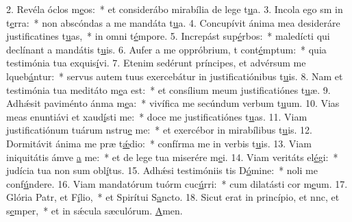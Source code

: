 2. Revéla óclos m\uline{e}os:~* et considerábo mirabília de lege t\uline{u}a.
3. Incola ego sm in t\uline{e}rra:~* non abscóndas a me mandáta t\uline{u}a.
4. Concupívit ánima mea desideráre justificatines t\uline{u}as,~* in omni t\uline{é}mpore.
5. Increpást sup\uline{é}rbos:~* maledícti qui declínant a mandátis t\uline{u}is.
6. Aufer a me oppróbrium, t cont\uline{é}mptum:~* quia testimónia tua exquis\uline{í}vi.
7. Etenim sedérunt príncipes, et advérsum me lqueb\uline{á}ntur:~* servus autem tuus exercebátur in justificatiónibus t\uline{u}is.
8. Nam et testimónia tua meditáto m\uline{e}a est:~* et consílium meum justificatiónes t\uline{u}æ.
9. Adhǽsit paviménto ánma m\uline{e}a:~* vivífica me secúndum verbum t\uline{u}um.
10. Vias meas enuntiávi et xaud\uline{í}sti me:~* doce me justificatiónes t\uline{u}as.
11. Viam justificatiónum tuárum nstru\uline{e} me:~* et exercébor in mirabílibus t\uline{u}is.
12. Dormitávit ánima me præ t\uline{ǽ}dio:~* confírma me in verbis t\uline{u}is.
13. Viam iniquitátis ámve \uline{a} me:~* et de lege tua miserére m\uline{e}i.
14. Viam veritáts el\uline{é}gi:~* judícia tua non sum obl\uline{í}tus.
15. Adhǽsi testimóniis tis D\uline{ó}mine:~* noli me conf\uline{ú}ndere.
16. Viam mandatórum tuórm cuc\uline{ú}rri:~* cum dilatásti cor m\uline{e}um.
17. Glória Patr, et F\uline{í}lio,~* et Spirítui S\uline{a}ncto.
18. Sicut erat in princípio, et nnc, et s\uline{e}mper,~* et in sǽcula sæculórum. \uline{A}men.

